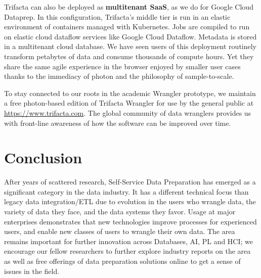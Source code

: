 \documentclass[11pt]{article}
\begin{document}
Trifacta can also be deployed as \textbf{multitenant SaaS}, as we do for Google Cloud Dataprep. In this configuration, Trifacta's middle tier is run in an elastic environment of containers managed with Kubernetes. Jobs are compiled to run on elastic cloud dataflow services like Google Cloud Dataflow. Metadata is stored in a multitenant cloud database. We have seen users of this deployment
routinely transform petabytes of data and consume thousands of compute hours. Yet they share the same agile experience in the browser enjoyed by smaller user cases thanks to the immediacy of photon and the philosophy of sample-to-scale.

To stay connected to our roots in the academic Wrangler prototype, we maintain a free photon-based edition of Trifacta Wrangler for use by the general public at \url{https://www.trifacta.com}. The global community of data wranglers provides us with front-line awareness of how the software can be improved over time.

\section{Conclusion}
After years of scattered research, Self-Service Data Preparation has emerged as a significant category in the data industry. It has a different technical focus than legacy data integration/ETL due to evolution in the users who wrangle data, the variety of data they face, and the data systems they favor. Usage at major enterprises demonstrates that new technologies improve processes for experienced users, and enable new classes of users to wrangle their own data. The area remains important for further innovation across Databases, AI, PL and HCI; we encourage our fellow researchers to further explore industry reports on the area~\cite{bloor, dresner, gartner-peer-insights, forrester-wave,gartner-marketguide-2017} as well as free offerings of data preparation solutions online to get a sense of issues in the field.
\end{document}
